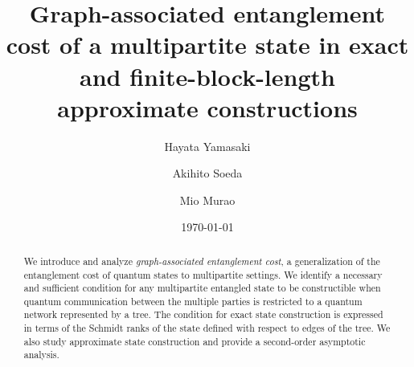 \documentclass[preprintnumbers,aps,amsmath,amssymb,pra,twocolumn,showpacs,superscriptaddress,floatfix]{revtex4-1}
\theoremstyle{plain}
\theoremstyle{definition}
\theoremstyle{remark}
\begin{document}
\title{Graph-associated entanglement cost of a multipartite state in exact and finite-block-length approximate constructions}

\author{Hayata Yamasaki}
\author{Akihito Soeda}
\author{Mio Murao}

\date{\today}

\begin{abstract}
    We introduce and analyze \textit{graph-associated entanglement cost}, a generalization of the entanglement cost of quantum states to multipartite settings.  We identify a necessary and sufficient condition for any multipartite entangled state to be constructible when quantum communication between the multiple parties is restricted to a  quantum network represented by a tree.  The condition for exact state construction is expressed in terms of the Schmidt ranks of the state defined with respect to edges of the tree.  We also study approximate state construction and provide a second-order asymptotic analysis.
\end{abstract}



\maketitle
\end{document}
